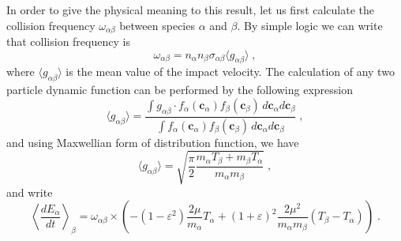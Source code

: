 \documentclass[preprint, aps, pra]{revtex4-1}
\newcommand{\ab}{{\alpha\beta}}
\newcommand{\eps}{\varepsilon}
\newcommand{\bc}{{\bm{c}}}
\begin{document}
In order to give the physical meaning to this result, let us first calculate the collision frequency $\omega_\ab$ between species $\alpha$
and $\beta$. By simple logic we can write that collision frequency is
\begin{equation}
  \omega_\ab = n_\alpha n_\beta\sigma_\ab\langle g_\ab\rangle\;,
\end{equation}
where $\langle g_\ab\rangle$ is the mean value of the impact velocity. The calculation of any two particle dynamic function can be performed
by the following expression
\begin{equation}
  \langle g_\ab\rangle=\frac{\int g_\ab\cdot f_\alpha(\bc_\alpha)f_\beta(\bc_\beta)\,d\bc_\alpha d\bc_\beta}
  {\int f_\alpha(\bc_\alpha)f_\beta(\bc_\beta)\,d\bc_\alpha d\bc_\beta}\;,
\end{equation}
and using Maxwellian form of distribution function, we have 
\begin{equation}
  \langle g_\ab\rangle=\sqrt{\frac{\pi}{2}\frac{m_\alpha T_\beta+m_\beta T_\alpha}{m_\alpha m_\beta}}\;,
\end{equation}
and write 
\begin{equation}
  \left\langle\frac{dE_\alpha}{dt}\right\rangle_\beta = \omega_\ab\times\left(-(1-\eps^2)\frac{2\mu}{m_\alpha}T_\alpha+
  (1+\eps)^2\frac{2\mu^2}{m_\alpha m_\beta}(T_\beta-T_\alpha)\right)\;.
\end{equation}







  
  
\end{document}
